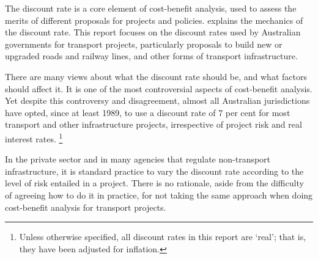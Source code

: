 \documentclass{grattan}
\begin{document}
The discount rate is a core element of cost-benefit analysis, used to assess the merits of different proposals for projects and policies.  explains the mechanics of the discount rate. This report focuses on the discount rates used by Australian governments for transport projects, particularly proposals to build new or upgraded roads and railway lines, and other forms of transport infrastructure.

There are many views about what the discount rate should be, and what factors should affect it. It is one of the most controversial aspects of cost-benefit analysis. Yet despite this controversy and disagreement, almost all Australian jurisdictions have opted, since at least 1989, to use a discount rate of 7 per cent for most transport and other infrastructure projects, irrespective of project risk and real interest rates.%
    \footnote{Unless otherwise specified, all discount rates in this report are `real'; that is, they have been adjusted for inflation.} 

In the private sector and in many agencies that regulate non-transport infrastructure, it is standard practice to vary the discount rate according to the level of risk entailed in a project. There is no rationale, aside from the difficulty of agreeing how to do it in practice, for not taking the same approach when doing cost-benefit analysis for transport projects.
\end{document}
